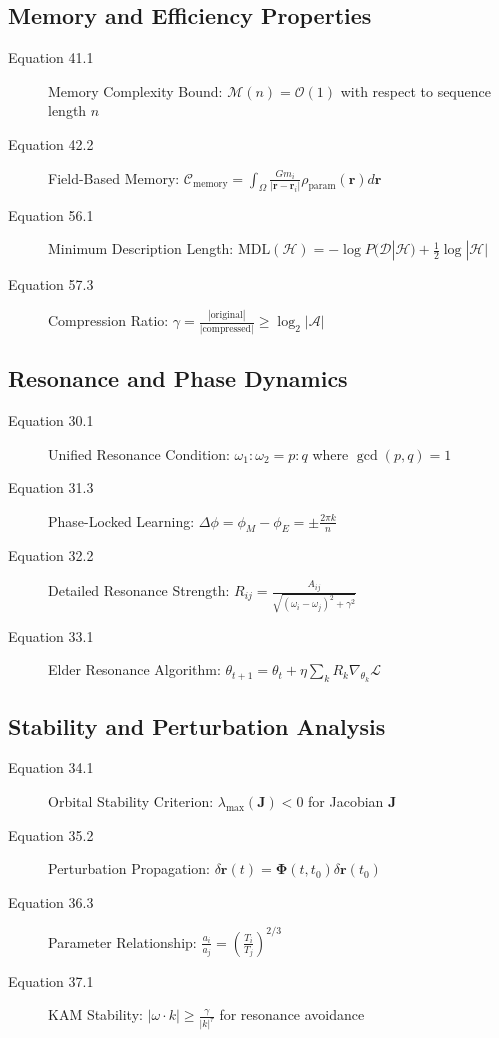\subsection{Memory and Efficiency Properties}

\begin{description}
\item[Equation 41.1] Memory Complexity Bound: $\mathcal{M}(n) = \mathcal{O}(1)$ with respect to sequence length $n$
\item[Equation 42.2] Field-Based Memory: $\mathcal{C}_{\text{memory}} = \int_{\Omega} \frac{G m_i}{|\mathbf{r} - \mathbf{r}_i|} \rho_{\text{param}}(\mathbf{r}) d\mathbf{r}$
\item[Equation 56.1] Minimum Description Length: $\text{MDL}(\mathcal{H}) = -\log P(\mathcal{D}|\mathcal{H}) + \frac{1}{2}\log|\mathcal{H}|$
\item[Equation 57.3] Compression Ratio: $\gamma = \frac{|\text{original}|}{|\text{compressed}|} \geq \log_2 |\mathcal{A}|$
\end{description}

\subsection{Resonance and Phase Dynamics}

\begin{description}
\item[Equation 30.1] Unified Resonance Condition: $\omega_1 : \omega_2 = p : q$ where $\gcd(p,q) = 1$
\item[Equation 31.3] Phase-Locked Learning: $\Delta \phi = \phi_M - \phi_E = \pm \frac{2\pi k}{n}$
\item[Equation 32.2] Detailed Resonance Strength: $R_{ij} = \frac{A_{ij}}{\sqrt{(\omega_i - \omega_j)^2 + \gamma^2}}$
\item[Equation 33.1] Elder Resonance Algorithm: $\theta_{t+1} = \theta_t + \eta \sum_k R_k \nabla_{\theta_k} \mathcal{L}$
\end{description}

\subsection{Stability and Perturbation Analysis}

\begin{description}
\item[Equation 34.1] Orbital Stability Criterion: $\lambda_{\max}(\mathbf{J}) < 0$ for Jacobian $\mathbf{J}$
\item[Equation 35.2] Perturbation Propagation: $\delta \mathbf{r}(t) = \mathbf{\Phi}(t,t_0) \delta \mathbf{r}(t_0)$
\item[Equation 36.3] Parameter Relationship: $\frac{a_i}{a_j} = \left(\frac{T_i}{T_j}\right)^{2/3}$
\item[Equation 37.1] KAM Stability: $|\omega \cdot k| \geq \frac{\gamma}{|k|^{\tau}}$ for resonance avoidance
\end{description}

